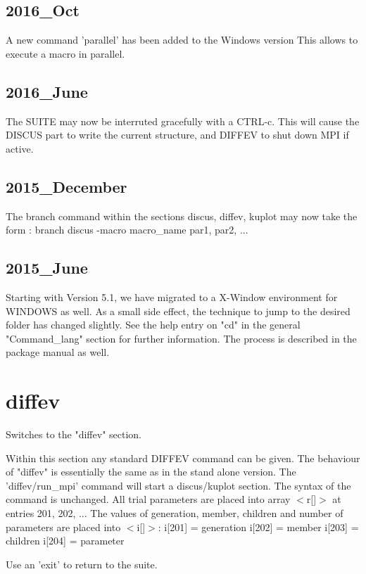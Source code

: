 \subsection*{2016\_Oct}
\par
A new command 'parallel' has been added to the Windows version 
This allows to execute a macro in parallel. 
\par
\subsection*{2016\_June}
\par
The SUITE may now be interruted gracefully with a CTRL-c. 
This will cause the DISCUS part to write the current structure, 
and DIFFEV to shut down MPI if active. 
\subsection*{2015\_December}
\par
The branch command within the sections discus, diffev, kuplot may 
now take the form : 
branch discus -macro macro\_name par1, par2, ... 
\subsection*{2015\_June}
\par
Starting with Version 5.1, we have migrated to a X-Window 
environment for WINDOWS as well. As a small side effect, 
the technique to jump to the desired folder has changed slightly. 
See the help entry on "cd" in the general "Command\_lang" section 
for further information. The process is described in the 
package manual as well. 
\par
\section{diffev}
\par
Switches to the "diffev" section. 
\par
Within this section any standard DIFFEV command can be 
given. The behaviour of "diffev" is essentially the same 
as in the stand alone version. 
The 'diffev/run\_mpi' command will start a discus/kuplot 
section. The syntax of the command is unchanged. 
All trial parameters are placed into array $ <$r[]$> $ at 
entries 201, 202, ... 
The values of generation, member, children and number 
of parameters are placed into $ <$i[]$> $: 
i[201] = generation 
i[202] = member 
i[203] = children 
i[204] = parameter 
\par
Use an 'exit' to return to the suite. 
